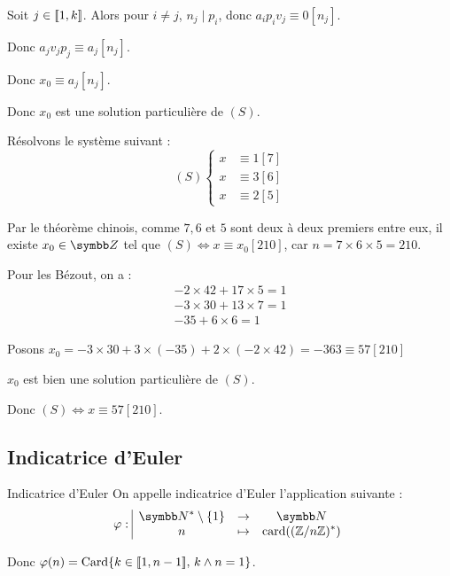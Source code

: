 Soit $j \in [\![1, k]\!]$. Alors pour $i \neq j$, $n_j \mid p_i$, donc $a_ip_iv_j \equiv 0 [n_j]$.

Donc $a_j v_j p_j \equiv a_j [n_j]$.

Donc $x_0 \equiv a_j [n_j]$.

Donc $x_0$ est une solution particulière de $(S)$.

\begin{exemple}
    Résolvons le système suivant : 
    \[
        (S) \left\{ 
            \begin{aligned}
                x & \equiv 1 [7] \\
                x & \equiv 3 [6] \\
                x & \equiv 2 [5]
            \end{aligned}
        \right.
    \]

    Par le théorème chinois, comme $7, 6$ et $5$ sont deux à deux premiers entre eux, 
    il existe $x_0 \in \Z$ tel que $(S) \Leftrightarrow x \equiv x_0 [210]$, car 
    $n = 7 \times 6 \times 5 = 210$.

    Pour les Bézout, on a :
    \[
        \begin{array}{rcl}
            -2 \times 42 + 17 \times 5 = 1 \\
            -3 \times 30 + 13 \times 7 = 1 \\
            - 35 + 6 \times 6 = 1
        \end{array}
    \]

    Posons $x_0 = -3 \times 30 + 3 \times (-35) + 2 \times (-2 \times 42) = -363 \equiv 57 [210] $

    $x_0$ est bien une solution particulière de $(S)$.

    Donc $(S) \Leftrightarrow x \equiv 57 [210]$.

\end{exemple}


\subsection{Indicatrice d'Euler }

\begin{definition}{Indicatrice d'Euler}{}
    On appelle indicatrice d'Euler l'application suivante : 
    \[\fonction{\varphi}{\N^* \setminus \{1 \}}{\N}{n}{\operatorname{card}((\zz n)^*)}\]

    Donc $\varphi(n) = \operatorname{Card}\{ k \in [\![1, n - 1]\!] , \, k \wedge n = 1\}$.
\end{definition}

